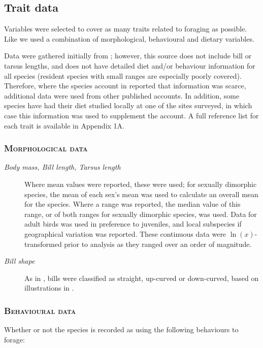 \documentclass[12pt,a4paper]{book}
\begin{document}
\subsection{Trait data}	

Variables were selected to cover as many traits related to foraging as possible. Like \citet{Mendez2012} we used a combination of morphological, behavioural and dietary variables.

Data were gathered initially from \citet{DelHoyo2016}; however, this source does not include bill or tarsus lengths, and does not have detailed diet and/or behaviour information for all species (resident species with small ranges are especially poorly covered). Therefore, where the species account in \citet{DelHoyo2016} reported that information was scarce, additional data were used from other published accounts. In addition, some species have had their diet studied locally at one of the sites surveyed, in which case this information was used to supplement the \citet{DelHoyo2016} account. A full reference list for each trait is available in Appendix 1A.


\subsubsection{\textsc{Morphological data}}

\begin{description}
\item[\textit{Body mass, Bill length, Tarsus length}] Where mean values were reported, these were used; for sexually dimorphic species, the mean of each sex's mean was used to calculate an overall mean for the species. Where a range was reported, the median value of this range, or of both ranges for sexually dimorphic species, was used. Data for adult birds was used in preference to juveniles, and local subspecies if geographical variation was reported. These continuous data were $\ln(x)$-transformed prior to analysis as they ranged over an order of magnitude.
\item[\textit{Bill shape}] As in \citet{Mendez2012}, bills were classified as straight, up-curved or down-curved, based on illustrations in \citet{DelHoyo2016}.
\end{description}
\medskip
\subsubsection{\textsc{Behavioural data}} Whether or not the species is recorded as using the following behaviours to forage:
\end{document}
